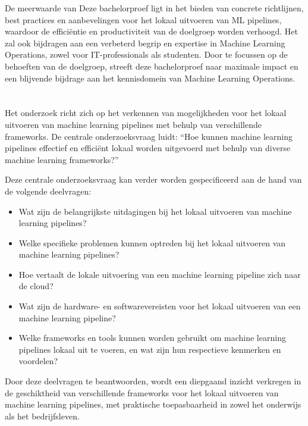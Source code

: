 De meerwaarde van Deze bachelorproef ligt in het bieden van concrete richtlijnen, best practices en aanbevelingen voor het lokaal uitvoeren van ML pipelines, waardoor de efficiëntie en productiviteit van de doelgroep worden verhoogd. Het zal ook bijdragen aan een verbeterd begrip en expertise in Machine Learning Operations, zowel voor IT-professionals als studenten. Door te focussen op de behoeften van de doelgroep, streeft deze bachelorproef naar maximale impact en een blijvende bijdrage aan het kennisdomein van Machine Learning Operations.

\section{}%
\label{sec:onderzoeksvraag}

Het onderzoek richt zich op het verkennen van mogelijkheden voor het lokaal uitvoeren van machine learning pipelines met behulp van verschillende frameworks. De centrale onderzoeksvraag luidt: ``Hoe kunnen machine learning pipelines effectief en efficiënt lokaal worden uitgevoerd met behulp van diverse machine learning frameworks?''

Deze centrale onderzoeksvraag kan verder worden gespecificeerd aan de hand van de volgende deelvragen:
\begin{itemize}
  \item Wat zijn de belangrijkste uitdagingen bij het lokaal uitvoeren van machine learning pipelines?
  \item Welke specifieke problemen kunnen optreden bij het lokaal uitvoeren van machine learning pipelines?
  \item Hoe vertaalt de lokale uitvoering van een machine learning pipeline zich naar de cloud?
  \item Wat zijn de hardware- en softwarevereisten voor het lokaal uitvoeren van een machine learning pipeline?
  \item Welke frameworks en tools kunnen worden gebruikt om machine learning pipelines lokaal uit te voeren, en wat zijn hun respectieve kenmerken en voordelen?
\end{itemize}

Door deze deelvragen te beantwoorden, wordt een diepgaand inzicht verkregen in de geschiktheid van verschillende frameworks voor het lokaal uitvoeren van machine learning pipelines, met praktische toepasbaarheid in zowel het onderwijs als het bedrijfsleven.

\section{}%
\label{sec:onderzoeksdoelstelling}

